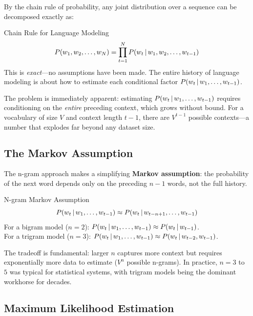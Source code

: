 By the chain rule of probability, any joint distribution over a sequence can
be decomposed exactly as:

\begin{mathresult}{Chain Rule for Language Modeling}
\begin{equation}
P(w_1, w_2, \ldots, w_N) = \prod_{t=1}^{N} P(w_t \,|\, w_1, w_2, \ldots, w_{t-1})
\label{eq:chain_rule}
\end{equation}
This is \emph{exact}---no assumptions have been made.  The entire history of
language modeling is about how to estimate each conditional factor
$P(w_t \,|\, w_1, \ldots, w_{t-1})$.
\end{mathresult}

The problem is immediately apparent: estimating $P(w_t \,|\, w_1, \ldots, w_{t-1})$
requires conditioning on the \emph{entire} preceding context, which grows
without bound.  For a vocabulary of size $V$ and context length $t-1$, there
are $V^{t-1}$ possible contexts---a number that explodes far beyond any
dataset size.

\subsection{The Markov Assumption}

The n-gram approach makes a simplifying \textbf{Markov assumption}: the
probability of the next word depends only on the preceding $n-1$ words, not
the full history.

\begin{mathresult}{N-gram Markov Assumption}
\begin{equation}
P(w_t \,|\, w_1, \ldots, w_{t-1}) \approx P(w_t \,|\, w_{t-n+1}, \ldots, w_{t-1})
\label{eq:markov}
\end{equation}
For a bigram model ($n=2$): $P(w_t \,|\, w_1, \ldots, w_{t-1}) \approx P(w_t \,|\, w_{t-1})$.\\
For a trigram model ($n=3$): $P(w_t \,|\, w_1, \ldots, w_{t-1}) \approx P(w_t \,|\, w_{t-2}, w_{t-1})$.
\end{mathresult}

The tradeoff is fundamental: larger $n$ captures more context but requires
exponentially more data to estimate ($V^n$ possible n-grams).  In practice,
$n = 3$ to $5$ was typical for statistical systems, with trigram models being
the dominant workhorse for decades.

\subsection{Maximum Likelihood Estimation}

